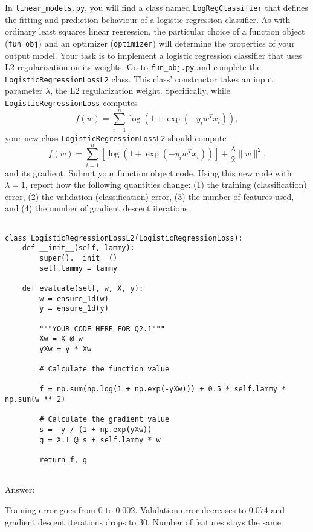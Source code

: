 \documentclass{article}
\newcommand{\blu}[1]{{\textcolor{blu}{#1}}}
\newenvironment{answer}{\par\begingroup\color{gre}Answer: }{\endgroup}
\let\ask\blu
\newcommand{\norm}[1]{\lVert #1 \rVert}
\begin{document}
In \verb|linear_models.py|, you will find a class named \verb|LogRegClassifier| that defines the fitting and prediction behaviour of a logistic regression classifier. As with ordinary least squares linear regression, the particular choice of a function object (\verb|fun_obj|) and an optimizer (\verb|optimizer|) will determine the properties of your output model.
Your task is to implement a logistic regression classifier that uses L2-regularization on its weights. Go to \verb|fun_obj.py| and complete the \verb|LogisticRegressionLossL2| class. This class' constructor takes an input parameter $\lambda$, the L2 regularization weight. Specifically, while \verb|LogisticRegressionLoss| computes
\[
f(w) = \sum_{i=1}^n \log(1+\exp(-y_iw^Tx_i)),
\]
your new class \verb|LogisticRegressionLossL2| should compute
\[
f(w) = \sum_{i=1}^n \left[\log(1+\exp(-y_iw^Tx_i))\right] + \frac{\lambda}{2}\norm{w}^2.
\]
and its gradient.
\ask{Submit your function object code. Using this new code with $\lambda = 1$, report how the following quantities change: (1) the training (classification) error, (2) the validation (classification) error, (3) the number of features used, and (4) the number of gradient descent iterations.}

\begin{verbatim}

class LogisticRegressionLossL2(LogisticRegressionLoss):
    def __init__(self, lammy):
        super().__init__()
        self.lammy = lammy

    def evaluate(self, w, X, y):
        w = ensure_1d(w)
        y = ensure_1d(y)

        """YOUR CODE HERE FOR Q2.1"""
        Xw = X @ w
        yXw = y * Xw 

        # Calculate the function value

        f = np.sum(np.log(1 + np.exp(-yXw))) + 0.5 * self.lammy * np.sum(w ** 2)

        # Calculate the gradient value
        s = -y / (1 + np.exp(yXw))
        g = X.T @ s + self.lammy * w

        return f, g
    
\end{verbatim}

\begin{answer}
    

Training error goes from 0 to 0.002. Validation error decreases to 0.074 and gradient descent iterations drops to 30. Number of features stays the same.
\end{answer}
\end{document}

